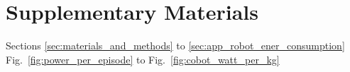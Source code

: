 \documentclass[12pt]{article}
\begin{document}
\section*{Supplementary Materials}
Sections \ref{sec:materials_and_methods} to \ref{sec:app_robot_ener_consumption}\\
Fig.~\ref{fig:power_per_episode} to Fig.~\ref{fig:cobot_watt_per_kg}

\renewcommand\refname{References and Notes}


\end{document}
